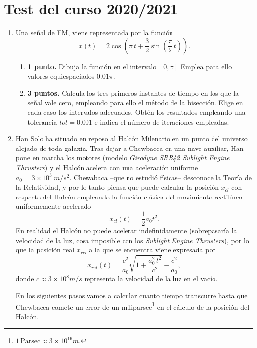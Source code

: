 \section{Test del curso 2020/2021}
\begin{enumerate}
\item Una señal de FM, viene representada por la función
\begin{equation}
	x(t) = 2\cos\left(\pi \, t+ \frac{3}{2}\sin\left(\frac{\pi}{2} \, t\right)\right).
\end{equation}
\begin{enumerate}
	\item \textbf{1 punto. }Dibuja la función en el intervalo $[0,\pi]$ Emplea para ello valores equiespaciados $0.01\pi$.
	\item \textbf{3 puntos. }Calcula los tres primeros instantes de tiempo en los que la señal vale cero, empleando para ello el método de la bisección. Elige en cada caso los intervalos adecuados. Obtén los resultados empleando una tolerancia $tol=0.001$ e indica el número de iteraciones empleadas.
\end{enumerate}

\item  Han Solo ha situado en reposo al Halcón Milenario en un punto del universo alejado de toda galaxia. Tras dejar a Chewbacca en una nave auxiliar, Han pone en marcha los motores (modelo \emph{Girodyne SRB42 Sublight Engine Thrusters}) y el Halcón acelera con una aceleración uniforme $a_0 = 3\times10^3\ m/s^2$. Chewabaca --que no estudió físicas--  desconoce la Teoría de la Relatividad, y por lo tanto piensa que puede calcular la posición $x_{cl}$ con respecto del Halcón empleando la función clásica del movimiento rectilíneo uniformemente acelerado
\begin{equation}
	x_{cl}(t) =\frac{1}{2}a_0t^2.
\end{equation}
		En realidad el Halcón no puede acelerar indefinidamente (sobrepasaría la velocidad de la luz, cosa imposible con los \emph{Sublight Engine Thrusters}), por lo que la posición real $x_{rel}$ a la que se encuentra viene expresada por
\begin{equation}
	x_{rel}(t) = \frac{c^2}{a_0}\sqrt{1 + \frac{a_0^2\,t^2}{c^2}} -\frac{c^2}{a_0}, 
\end{equation}
		donde $c \approx 3\times 10^8 m/s$ representa la velocidad de la luz en el vacío. 

		En los siguientes pasos vamos a calcular cuanto tiempo transcurre hasta que Chewbacca comete un error de un miliparsec\footnote{$1\,\text{Parsec} \approx 3\times 10^{16}m$.} en el cálculo de la posición del Halcón.


\end{enumerate}
